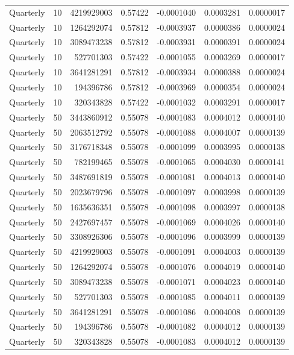 \begin{longtable}{llrrrrr}
Quarterly & 10 & 4219929003 & 0.57422 & -0.0001040 & 0.0003281 & 0.0000017 \\
Quarterly & 10 & 1264292074 & 0.57812 & -0.0003937 & 0.0000386 & 0.0000024 \\
Quarterly & 10 & 3089473238 & 0.57812 & -0.0003931 & 0.0000391 & 0.0000024 \\
Quarterly & 10 & 527701303 & 0.57422 & -0.0001055 & 0.0003269 & 0.0000017 \\
Quarterly & 10 & 3641281291 & 0.57812 & -0.0003934 & 0.0000388 & 0.0000024 \\
Quarterly & 10 & 194396786 & 0.57812 & -0.0003969 & 0.0000354 & 0.0000024 \\
Quarterly & 10 & 320343828 & 0.57422 & -0.0001032 & 0.0003291 & 0.0000017 \\
Quarterly & 50 & 3443860912 & 0.55078 & -0.0001083 & 0.0004012 & 0.0000140 \\
Quarterly & 50 & 2063512792 & 0.55078 & -0.0001088 & 0.0004007 & 0.0000139 \\
Quarterly & 50 & 3176718348 & 0.55078 & -0.0001099 & 0.0003995 & 0.0000138 \\
Quarterly & 50 & 782199465 & 0.55078 & -0.0001065 & 0.0004030 & 0.0000141 \\
Quarterly & 50 & 3487691819 & 0.55078 & -0.0001081 & 0.0004013 & 0.0000140 \\
Quarterly & 50 & 2023679796 & 0.55078 & -0.0001097 & 0.0003998 & 0.0000139 \\
Quarterly & 50 & 1635636351 & 0.55078 & -0.0001098 & 0.0003997 & 0.0000138 \\
Quarterly & 50 & 2427697457 & 0.55078 & -0.0001069 & 0.0004026 & 0.0000140 \\
Quarterly & 50 & 3308926306 & 0.55078 & -0.0001096 & 0.0003999 & 0.0000139 \\
Quarterly & 50 & 4219929003 & 0.55078 & -0.0001091 & 0.0004003 & 0.0000139 \\
Quarterly & 50 & 1264292074 & 0.55078 & -0.0001076 & 0.0004019 & 0.0000140 \\
Quarterly & 50 & 3089473238 & 0.55078 & -0.0001071 & 0.0004023 & 0.0000140 \\
Quarterly & 50 & 527701303 & 0.55078 & -0.0001085 & 0.0004011 & 0.0000139 \\
Quarterly & 50 & 3641281291 & 0.55078 & -0.0001086 & 0.0004008 & 0.0000139 \\
Quarterly & 50 & 194396786 & 0.55078 & -0.0001082 & 0.0004012 & 0.0000139 \\
Quarterly & 50 & 320343828 & 0.55078 & -0.0001083 & 0.0004012 & 0.0000139 \\

\end{longtable}
